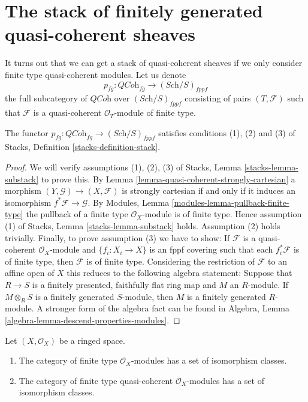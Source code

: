 \section{The stack of finitely generated quasi-coherent sheaves}
\label{section-stack-of-finitely-generated-quasi-coherent-sheaves}

\noindent
It turns out that we can get a stack of quasi-coherent sheaves
if we only consider finite type quasi-coherent modules.
Let us denote
$$
p_{fg} : \textit{QCoh}_{fg} \to (\textit{Sch}/S)_{fppf}
$$
the full subcategory of $\textit{QCoh}$ over $(\textit{Sch}/S)_{fppf}$ 
consisting of pairs $(T, \mathcal{F})$ such that $\mathcal{F}$
is a quasi-coherent $\mathcal{O}_T$-module of finite type.

\begin{lemma}
\label{lemma-stack-of-finite-type-quasi-coherent-sheaves}
The functor $p_{fg} : \textit{QCoh}_{fg} \to (\textit{Sch}/S)_{fppf}$
satisfies conditions (1), (2) and (3) of
Stacks, Definition \ref{stacks-definition-stack}.
\end{lemma}

\begin{proof}
We will verify assumptions (1), (2), (3) of
Stacks, Lemma \ref{stacks-lemma-substack}
to prove this. By
Lemma \ref{lemma-quasi-coherent-strongly-cartesian}
a morphism $(Y, \mathcal{G}) \to (X, \mathcal{F})$ is
strongly cartesian if and only if it induces an isomorphism
$f^*\mathcal{F} \to \mathcal{G}$. By
Modules, Lemma \ref{modules-lemma-pullback-finite-type}
the pullback of a finite type $\mathcal{O}_X$-module is of finite
type. Hence assumption (1) of
Stacks, Lemma \ref{stacks-lemma-substack}
holds. Assumption (2) holds trivially.
Finally, to prove assumption (3) we have to show:
If $\mathcal{F}$ is a quasi-coherent $\mathcal{O}_X$-module
and $\{f_i : X_i \to X\}$ is an fppf covering such that each
$f_i^*\mathcal{F}$ is of finite type, then $\mathcal{F}$ is of
finite type. Considering the restriction of $\mathcal{F}$ to
an affine open of $X$ this reduces to the following algebra statement:
Suppose that $R \to S$ is a finitely presented, faithfully flat ring map
and $M$ an $R$-module. If $M \otimes_R S$ is a finitely generated
$S$-module, then $M$ is a finitely generated $R$-module.
A stronger form of the algebra fact can be found in
Algebra, Lemma \ref{algebra-lemma-descend-properties-modules}.
\end{proof}

\begin{lemma}
\label{lemma-finite-type}
Let $(X, \mathcal{O}_X)$ be a ringed space.
\begin{enumerate}
\item The category of finite type $\mathcal{O}_X$-modules has a
set of isomorphism classes.
\item The category of finite type quasi-coherent
$\mathcal{O}_X$-modules has a set of isomorphism classes.
\end{enumerate}
\end{lemma}

